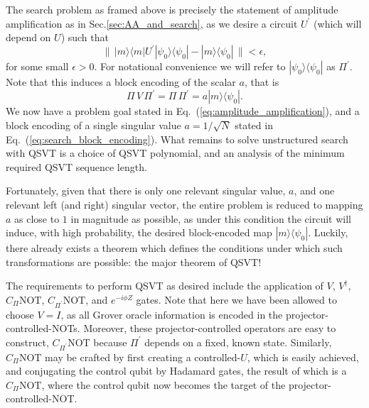 \documentclass[aps,pra,showpacs,notitlepage,twocolumn,superscriptaddress,nofootinbib]{revtex4-1}
\begin{document}
    The search problem as framed above is precisely the statement of amplitude amplification as in Sec.\ref{sec:AA_and_search}, as we desire a circuit $U^\prime$ (which will depend on $U$) such that
        \begin{equation} \label{eq:amplitude_amplification}
            \Big\lVert\,
            |m\rangle\langle m| U^\prime |\psi_0 \rangle\langle \psi_0| 
            - 
            |m \rangle\langle\psi_0|
            \,\Big\rVert 
            < 
            \epsilon,
        \end{equation}
    for some small $\epsilon > 0$. For notational convenience we will refer to $|\psi_0\rangle\langle \psi_0|$ as $\Pi^\prime$. Note that this induces a block encoding of the scalar $a$, that is
        \begin{equation} \label{eq:search_block_encoding}
            \Pi\, V\, \Pi^\prime = \Pi\, \Pi^\prime = a |m\rangle\langle\psi_0|.
        \end{equation}
    We now have a problem goal stated in Eq.~(\ref{eq:amplitude_amplification}), and a block encoding of a single singular value $a = 1/\sqrt{N}$ stated in Eq.~(\ref{eq:search_block_encoding}). What remains to solve unstructured search with QSVT is a choice of QSVT polynomial, and an analysis of the minimum required QSVT sequence length.
    
    Fortunately, given that there is only one relevant singular value, $a$, and one relevant left (and right) singular vector, the entire problem is reduced to mapping $a$ as close to $1$ in magnitude as possible, as under this condition the circuit will induce, with high probability, the desired block-encoded map $|m\rangle\langle \psi_0|$. Luckily, there already exists a theorem which defines the conditions under which such transformations are possible: the major theorem of QSVT!
    
    The requirements to perform QSVT as desired include the application of $V$, $V^\dag$, $C_{\Pi}\text{NOT}$, $C_{\Pi^\prime}\text{NOT}$, and $e^{-i\phi Z}$ gates. Note that here we have been allowed to choose $V = I$, as all Grover oracle information is encoded in the projector-controlled-NOTs. Moreover, these projector-controlled operators are easy to construct, $C_{\Pi^\prime}\text{NOT}$ because $\Pi^\prime$ depends on a fixed, known state. Similarly, $C_{\Pi}\text{NOT}$ may be crafted by first creating a controlled-$U$, which is easily achieved, and conjugating the control qubit by Hadamard gates, the result of which is a $C_{\Pi}\text{NOT}$, where the control qubit now becomes the target of the projector-controlled-NOT.
    
\end{document}
